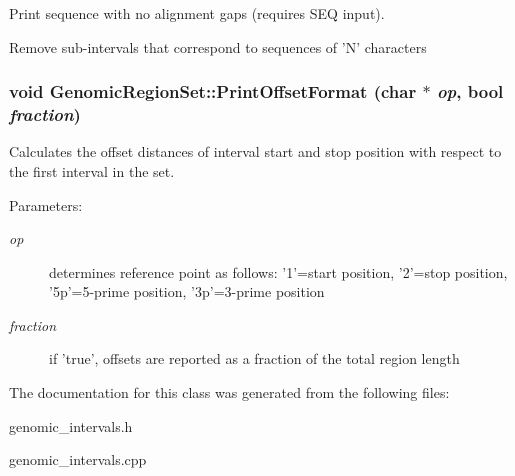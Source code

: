 Print sequence with no alignment gaps (requires SEQ input). 

Remove sub-intervals that correspond to sequences of 'N' characters \hypertarget{classGenomicRegionSet_e27a5c9f17f08afae277603e33d4fb91}{
\subsubsection[PrintOffsetFormat]{\setlength{\rightskip}{0pt plus 5cm}void GenomicRegionSet::PrintOffsetFormat (char $\ast$ {\em op}, \/  bool {\em fraction})}}
\label{classGenomicRegionSet_e27a5c9f17f08afae277603e33d4fb91}


Calculates the offset distances of interval start and stop position with respect to the first interval in the set. 

\begin{Desc}
\item[Parameters:]
\begin{description}
\item[{\em op}]determines reference point as follows: '1'=start position, '2'=stop position, '5p'=5-prime position, '3p'=3-prime position \item[{\em fraction}]if 'true', offsets are reported as a fraction of the total region length \end{description}
\end{Desc}


The documentation for this class was generated from the following files:\begin{CompactItemize}
\item 
genomic\_\-intervals.h\item 
genomic\_\-intervals.cpp\end{CompactItemize}
